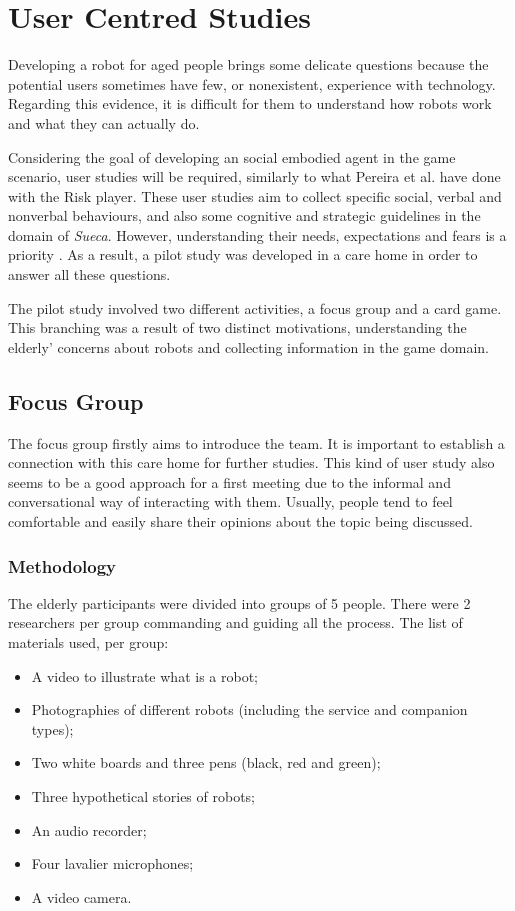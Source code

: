 \section{User Centred Studies} \label{sec:user-studies}

Developing a robot for aged people brings some delicate questions because the potential users sometimes have few, or nonexistent, experience with technology.
Regarding this evidence, it is difficult for them to understand how robots work and what they can actually do.

Considering the goal of developing an social embodied agent in the game scenario, user studies will be required, similarly to what Pereira et al. have done with the Risk player.
These user studies aim to collect specific social, verbal and nonverbal behaviours, and also some cognitive and strategic guidelines in the domain of \emph{Sueca}.
However, understanding their needs, expectations and fears is a priority \cite{Lisboa}. As a result, a pilot study was developed in a care home in order to answer all these questions.

The pilot study involved two different
activities, a focus group and a card game.
This branching was a result of two distinct motivations, understanding the elderly' concerns about robots and collecting information in the game domain.





\subsection{Focus Group}
The focus group firstly aims to introduce the team.
It is important to establish a connection with this care home for further studies.
This kind of user study also seems to be a good approach for a first meeting due to the informal and conversational way of interacting with them.
Usually, people tend to feel comfortable and easily share their opinions about the topic being discussed.

\subsubsection{Methodology}
The elderly participants were divided into groups of 5 people.
There were 2 researchers per group commanding and guiding all the process.
The list of materials used, per group:

\begin{itemize}
\item A video to illustrate what is a robot;
\item Photographies of different robots (including the service and companion types);
\item Two white boards and three pens (black, red and green);
\item Three hypothetical stories of robots;
\item An audio recorder;
\item Four lavalier microphones;
\item A video camera.
\end{itemize}


